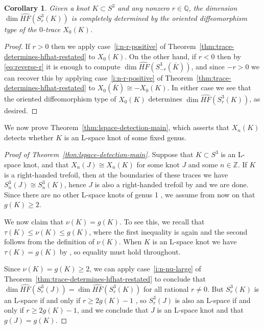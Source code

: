 \documentclass[11pt]{amsart}
\newtheorem {corollary}[theorem]{Corollary}
\numberwithin{equation}{section}
\numberwithin{theorem}{section}
\theoremstyle{definition}
\newcommand{\Z}{\mathbb{Z}}
\newcommand{\Q}{\mathbb{Q}}
\newcommand{\hfhat}{\widehat{\mathit{HF}}}
\newcommand{\mirror}[1]{\overline{#1}}
\begin{document}
\begin{corollary} \label{cor:0-trace-all-surgeries}
Given a knot $K \subset S^3$ and \emph{any} nonzero $r\in\Q$, the dimension $\dim\hfhat(S^3_r(K))$ is completely determined by the oriented diffeomorphism type of the $0$-trace $X_0(K)$.
\end{corollary}

\begin{proof}
If $r > 0$ then we apply case~\eqref{i:n-r-positive} of Theorem~\ref{thm:trace-determines-hfhat-restated} to $X_0(K)$.  On the other hand, if $r < 0$ then by \eqref{eq:reverse-r} it is enough to compute $\dim \hfhat(S^3_{-r}(\mirror{K}))$, and since $-r > 0$ we can recover this by applying case~\eqref{i:n-r-positive} of Theorem~\ref{thm:trace-determines-hfhat-restated} to $X_0(\mirror{K}) \cong -X_0(K)$.  In either case we see that the oriented diffeomorphism type of $X_0(K)$ determines $\dim\hfhat(S^3_r(K))$, as desired.
\end{proof}

We now prove Theorem~\ref{thm:lspace-detection-main}, which asserts that $X_n(K)$ detects whether $K$ is an L-space knot of some fixed genus.

\begin{proof}[Proof of Theorem~\ref{thm:lspace-detection-main}]
Suppose that $K \subset S^3$ is an L-space knot, and that $X_n(J) \cong X_n(K)$ for some knot $J$ and some $n \in \Z$.  If $K$ is a right-handed trefoil, then at the boundaries of these traces we have $S^3_n(J) \cong S^3_n(K)$, hence $J$ is also a right-handed trefoil by \cite{osz-characterizing} and we are done.  Since there are no other L-space knots of genus 1 \cite{ghiggini}, we assume from now on that $g(K) \geq 2$.

We now claim that $\nu(K) = g(K)$.  To see this, we recall that $\tau(K) \leq \nu(K) \leq g(K)$, where the first inequality is again \cite[Equation~(34)]{osz-rational} and the second follows from the definition of $\nu(K)$.  When $K$ is an L-space knot we have $\tau(K)=g(K)$ by \cite[Corollary~1.6]{osz-lens}, so equality must hold throughout.

Since $\nu(K) = g(K) \geq 2$, we can apply case~\eqref{i:n-nu-large} of Theorem~\ref{thm:trace-determines-hfhat-restated} to conclude that $\dim \hfhat(S^3_r(J)) = \dim \hfhat(S^3_r(K))$ for all rational $r \neq 0$.   But $S^3_r(K)$ is an L-space if and only if $r \geq 2g(K)-1$ \cite{osz-rational}, so $S^3_r(J)$ is also an L-space if and only if $r \geq 2g(K)-1$, and we conclude that $J$ is an L-space knot and that $g(J)=g(K)$.
\end{proof}
\end{document}
